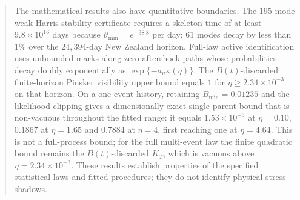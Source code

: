 \begin{abstract}
The mathematical results also have quantitative boundaries. The $195$-mode weak Harris stability certificate requires a skeleton time of at least $9.8\times10^{16}$ days because $\vartheta_{\min}=e^{-38.8}$ per day; $61$ modes decay by less than $1\%$ over the $24{,}394$-day New Zealand horizon. Full-law active identification uses unbounded marks along zero-aftershock paths whose probabilities decay doubly exponentially as $\exp\{-a_u\kappa(q)\}$. The $B(t)$-discarded finite-horizon Pinsker visibility upper bound equals $1$ for $\eta\geq2.34\times10^{-3}$ on that horizon. On a one-event history, retaining $B_{\min}=0.01235$ and the likelihood clipping gives a dimensionally exact single-parent bound that is non-vacuous throughout the fitted range: it equals $1.53\times10^{-3}$ at $\eta=0.10$, $0.1867$ at $\eta=1.65$ and $0.7884$ at $\eta=4$, first reaching one at $\eta=4.64$. This is not a full-process bound; for the full multi-event law the finite quadratic bound remains the $B(t)$-discarded $K_T$, which is vacuous above $\eta=2.34\times10^{-3}$. These results establish properties of the specified statistical laws and fitted procedures; they do not identify physical stress shadows.
\end{abstract}
